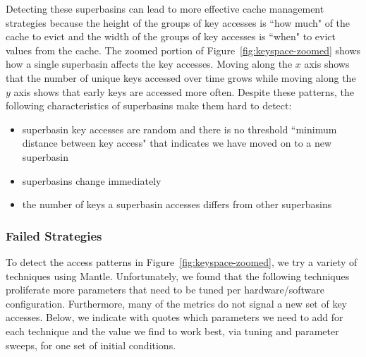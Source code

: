 Detecting these superbasins can lead to more effective cache management
strategies because the height of the groups of key accesses is ``how much" of
the cache to evict and the width of the groups of key accesses is ``when" to
evict values from the cache.  The zoomed portion of
Figure~\ref{fig:keyspace-zoomed} shows how a single superbasin affects the key
accesses. Moving along the \(x\) axis shows that the number of unique keys
accessed over time grows while moving along the \(y\) axis shows that early
keys are accessed more often.  Despite these patterns, the following
characteristics of superbasins make them hard to detect:

\begin{itemize}

  \item superbasin key accesses are random and there is no threshold ``minimum distance
  between key access" that indicates we have moved on to a new superbasin

  \item superbasins change immediately

  \item the number of keys a superbasin accesses differs from other superbasins

\end{itemize}

\subsubsection{Failed Strategies}

To detect the access patterns in Figure~\ref{fig:keyspace-zoomed}, we try a
variety of techniques using Mantle. Unfortunately, we found that the following
techniques proliferate more parameters that need to be tuned per
hardware/software configuration. Furthermore, many of the metrics do not signal
a new set of key accesses.  Below, we indicate with quotes which parameters we
need to add for each technique and the value we find to work best, via
tuning and parameter sweeps, for one set of initial conditions.

